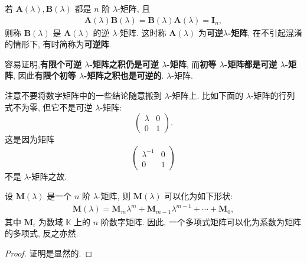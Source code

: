 \documentclass[../../main.tex]{subfiles}%
\begin{document}
\begin{definition}[可逆$\lambda$-矩阵]
若 $\boldsymbol{A}(\lambda),\boldsymbol{B}(\lambda)$ 都是 $n$ 阶 $\lambda$-矩阵, 且
\begin{align*}
\boldsymbol{A}(\lambda)\boldsymbol{B}(\lambda)=\boldsymbol{B}(\lambda)\boldsymbol{A}(\lambda)=\boldsymbol{I}_n,
\end{align*}
则称 $\boldsymbol{B}(\lambda)$ 是 $\boldsymbol{A}(\lambda)$ 的逆 $\lambda$-矩阵. 这时称 $\boldsymbol{A}(\lambda)$ 为\textbf{可逆$\lambda$-矩阵}, 在不引起混淆的情形下, 有时简称为\textbf{可逆阵}. 
\end{definition}
\begin{note}
容易证明,\textbf{有限个可逆 $\lambda$-矩阵之积仍是可逆 $\lambda$-矩阵}, 而\textbf{初等 $\lambda$-矩阵都是可逆 $\lambda$-矩阵}, 因此\textbf{有限个初等 $\lambda$-矩阵之积也是可逆的}. $\lambda$-矩阵.  
\end{note}
\begin{remark}
注意不要将数字矩阵中的一些结论随意搬到 $\lambda$-矩阵上. 比如下面的 $\lambda$-矩阵的行列式不为零, 但它不是可逆 $\lambda$-矩阵:
\[
\begin{pmatrix}
\lambda & 0 \\
0 & 1
\end{pmatrix}.
\]
这是因为矩阵
\[
\begin{pmatrix}
\lambda^{-1} & 0 \\
0 & 1
\end{pmatrix}
\]
不是 $\lambda$-矩阵之故. 
\end{remark}

\begin{lemma}
设 $\boldsymbol{M}(\lambda)$ 是一个 $n$ 阶 $\lambda$-矩阵, 则 $\boldsymbol{M}(\lambda)$ 可以化为如下形状:
\begin{align*}
\boldsymbol{M}(\lambda)=\boldsymbol{M}_m\lambda^m+\boldsymbol{M}_{m - 1}\lambda^{m - 1}+\cdots+\boldsymbol{M}_0,
\end{align*}
其中 $\boldsymbol{M}_i$ 为数域 $\mathbb{K}$ 上的 $n$ 阶数字矩阵. 因此, 一个多项式矩阵可以化为系数为矩阵的多项式, 反之亦然. 
\end{lemma}
\begin{proof}
证明是显然的.
\end{proof}
\end{document}
